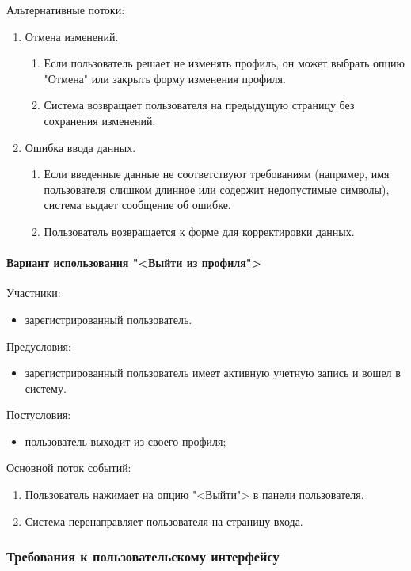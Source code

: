 Альтернативные потоки:
\begin{enumerate}
	\item Отмена изменений.
	\begin{enumerate}
		\item Если пользователь решает не изменять профиль, он может выбрать опцию "Отмена" или закрыть форму изменения профиля.
		\item Система возвращает пользователя на предыдущую страницу без сохранения изменений.
	\end{enumerate}
	\item Ошибка ввода данных.
	\begin{enumerate}
		\item Если введенные данные не соответствуют требованиям (например, имя пользователя слишком длинное или содержит недопустимые символы), система выдает сообщение об ошибке.
		\item Пользователь возвращается к форме для корректировки данных.
	\end{enumerate}
\end{enumerate}

\paragraph{Вариант использования "<Выйти из профиля">}

Участники:
\begin{itemize}
	\item зарегистрированный пользователь.
\end{itemize}

Предусловия:
\begin{itemize}
	\item зарегистрированный пользователь имеет активную учетную запись и вошел в систему.
\end{itemize}

Постусловия:
\begin{itemize}
	\item пользователь выходит из своего профиля;
\end{itemize}

Основной поток событий:
\begin{enumerate}
	\item Пользователь нажимает на опцию "<Выйти"> в панели пользователя.
	\item Система перенаправляет пользователя на страницу входа.
\end{enumerate}


\subsubsection{Требования к пользовательскому интерфейсу}

